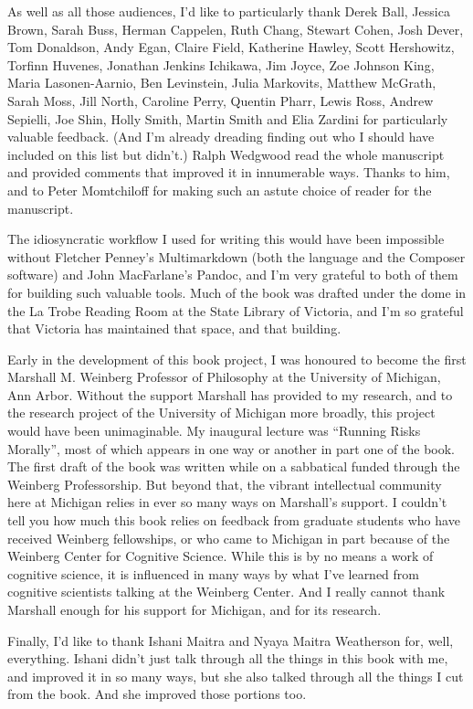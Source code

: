 As well as all those audiences, I'd like to particularly thank Derek Ball, Jessica Brown, Sarah Buss, Herman Cappelen, Ruth Chang, Stewart Cohen, Josh Dever, Tom Donaldson, Andy Egan, Claire Field, Katherine Hawley, Scott Hershowitz, Torfinn Huvenes, Jonathan Jenkins Ichikawa, Jim Joyce, Zoe Johnson King, Maria Lasonen-Aarnio, Ben Levinstein, Julia Markovits, Matthew McGrath, Sarah Moss, Jill North, Caroline Perry, Quentin Pharr, Lewis Ross, Andrew Sepielli, \gls{Joe} Shin, Holly Smith, Martin Smith and Elia Zardini for particularly valuable feedback. (And I'm already dreading finding out who I should have included on this list but didn't.) Ralph Wedgwood read the whole manuscript and provided comments that improved it in innumerable ways. Thanks to him, and to Peter Momtchiloff for making such an astute choice of reader for the manuscript.

The idiosyncratic workflow I used for writing this would have been impossible without Fletcher Penney's Multimarkdown (both the language and the Composer software) and John MacFarlane's Pandoc, and I'm very grateful to both of them for building such valuable tools. Much of the book was drafted under the dome in the La Trobe Reading Room at the State Library of Victoria, and I'm so grateful that Victoria has maintained that space, and that building.

Early in the development of this book project, I was honoured to become the first Marshall M. Weinberg Professor of Philosophy at the University of Michigan, Ann Arbor. Without the support Marshall has provided to my research, and to the research project of the University of Michigan more broadly, this project would have been unimaginable. My inaugural lecture was ``Running Risks Morally'', most of which appears in one way or another in part one of the book. The first draft of the book was written while on a sabbatical funded through the Weinberg Professorship. But beyond that, the vibrant intellectual community here at Michigan relies in ever so many ways on Marshall's support. I couldn't tell you how much this book relies on feedback from graduate students who have received Weinberg fellowships, or who came to Michigan in part because of the Weinberg Center for Cognitive Science. While this is by no means a work of cognitive science, it is influenced in many ways by what I've learned from cognitive scientists talking at the Weinberg Center. And I really cannot thank Marshall enough for his support for Michigan, and for its research.

Finally, I'd like to thank Ishani Maitra and Nyaya Maitra Weatherson for, well, everything. Ishani didn't just talk through all the things in this book with me, and improved it in so many ways, but she also talked through all the things I cut from the book. And she improved those portions too.


